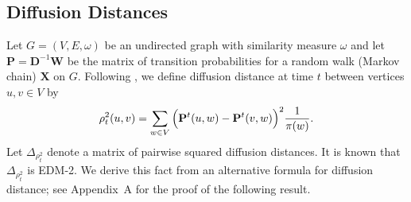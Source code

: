 \documentclass[10pt,twocolumn]{article}
\numberwithin{equation}{section}
\begin{document}
\subsection{Diffusion Distances}
\label{sec:diffusion-distances}
Let $G = (V,E,\omega)$ be an undirected graph with similarity measure
$\omega$ and let
$\mathbf{P} = \mathbf{D}^{-1}\mathbf{W}$
be the matrix of transition probabilities for a random walk
(Markov chain) $\mathbf{X}$ on $G$.
Following \cite{coifman06:_diffus_maps},
we define diffusion distance at time $t$ between vertices
$u,v \in V$ by
\begin{equation}
  \label{eq:11}
  \rho^{2}_{t}(u,v) = \sum_{w \in V}{\Bigl(\mathbf{P}^{t}(u,w) -
      \mathbf{P}^{t}(v,w)\Bigr)^2 \frac{1}{\pi(w)}}.
\end{equation}
\noindent
Let $\Delta_{\rho_t^2}$ denote a matrix of pairwise squared diffusion
distances.  It is known that $\Delta_{\rho_t^2}$ is EDM-2.
We derive this fact from an alternative formula for diffusion 
distance; see Appendix~A for the proof of the following result.
\end{document}
